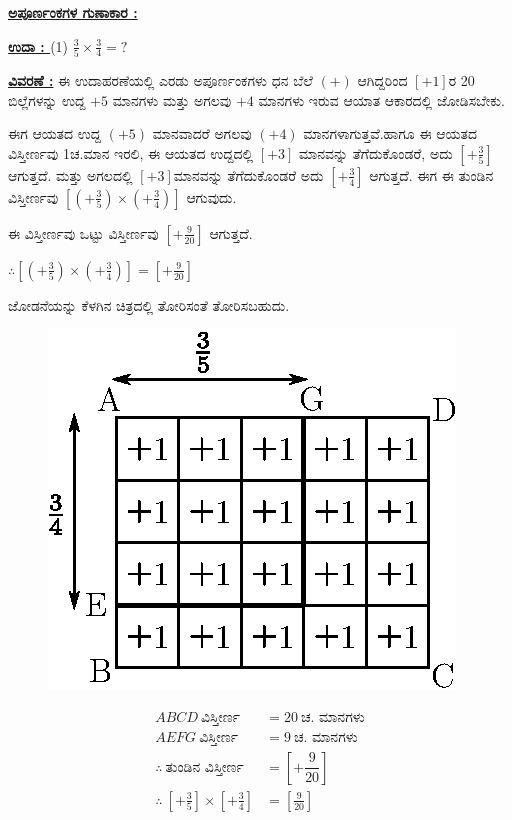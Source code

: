 \medskip
\noindent
{\textbf{\underline{ಅಪೂರ್ಣಂಕಗಳ ಗುಣಾಕಾರ :}}} 

\medskip
\noindent
{\textbf{\underline{ಉದಾ : }}} (1) $\frac{3}{5} \times \frac{3}{4} = ?$

\noindent
{\textbf{\underline{ವಿವರಣೆ :}}} ಈ ಉದಾಹರಣೆಯಲ್ಲಿ ಎರಡು ಅಪೂರ್ಣಂಕಗಳು ಧನ ಬೆಲೆ $(+)$ ಆಗಿದ್ದರಿಂದ $[+1]$ರ 20 ಬಿಲ್ಲೆಗಳನ್ನು ಉದ್ದ $+5$ ಮಾನಗಳು ಮತ್ತು ಅಗಲವು $+4$ ಮಾನಗಳು ಇರುವ ಆಯಾತ ಆಕಾರದಲ್ಲಿ ಜೋಡಿಸಬೇಕು. 

ಈಗ ಆಯತದ ಉದ್ದ $(+5)$ ಮಾನವಾದರೆ ಅಗಲವು $(+4)$ ಮಾನಗಳಾಗುತ್ತವೆ.\break ಹಾಗೂ ಈ ಆಯತದ ವಿಸ್ತೀರ್ಣವು 1ಚ.ಮಾನ ಇರಲಿ, ಈ ಆಯತದ ಉದ್ದದಲ್ಲಿ $[+3]$ ಮಾನವನ್ನು ತೆಗೆದುಕೊಂಡರೆ, ಅದು $\left[+\frac{3}{5}\right]$ ಆಗುತ್ತದೆ. ಮತ್ತು ಅಗಲದಲ್ಲಿ $[+3]$ಮಾನವನ್ನು ತೆಗೆದುಕೊಂಡರೆ ಅದು $\left[+\frac{3}{4}\right]$ ಆಗುತ್ತದೆ. ಈಗ ಈ ತುಂಡಿನ ವಿಸ್ತೀರ್ಣವು $\left[\left(+ \frac{3}{5}\right) \times \left(+\frac{3}{4}\right)\right]$ ಆಗುವುದು. 

ಈ ವಿಸ್ತೀರ್ಣವು ಒಟ್ಟು ವಿಸ್ತೀರ್ಣವು $\left[+\frac{9}{20}\right]$ ಆಗುತ್ತದೆ.

$\therefore \left[\left(+\frac{3}{5}\right) \times \left(+\frac{3}{4}\right) \right] = \left[+\frac{9}{20} \right]$

ಜೋಡನೆಯನ್ನು ಕೆಳಗಿನ ಚಿತ್ರದಲ್ಲಿ ತೋರಿಸಂತೆ ತೋರಿಸಬಹುದು. 
\begin{figure}[H]
\centering
\includegraphics[scale=0.8]{src/figure/chap3/fig3-23b.eps}
\end{figure}
\begin{align*}
ABCD ~\text{ವಿಸ್ತೀರ್ಣ}  & = 20 ~\text{ಚ. ಮಾನಗಳು}\\
AEFG ~\text{ವಿಸ್ತೀರ್ಣ} & = 9 ~\text{ಚ. ಮಾನಗಳು}\\
\therefore ~\text{ತುಂಡಿನ ವಿಸ್ತೀರ್ಣ} & = \left[+\dfrac{9}{20}\right]\\
\therefore \ \left[+\frac{3}{5}\right]\times \left[+\frac{3}{4}\right] &=\left[\frac{9}{20}\right]
\end{align*}

